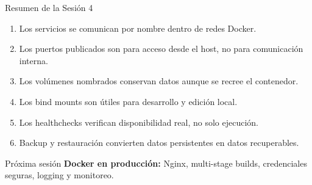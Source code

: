 \documentclass[aspectratio=169]{beamer}
\begin{document}
\begin{frame}{Resumen de la Sesión 4}
  \footnotesize
  \begin{enumerate}
    \item Los servicios se comunican por nombre dentro de redes Docker.
    \item Los puertos publicados son para acceso desde el host, no para comunicación interna.
    \item Los volúmenes nombrados conservan datos aunque se recree el contenedor.
    \item Los bind mounts son útiles para desarrollo y edición local.
    \item Los healthchecks verifican disponibilidad real, no solo ejecución.
    \item Backup y restauración convierten datos persistentes en datos recuperables.
  \end{enumerate}
  \vspace{0.08cm}
  \begin{alertblock}{Próxima sesión}
    \textbf{Docker en producción:} Nginx, multi-stage builds, credenciales seguras, logging y monitoreo.
  \end{alertblock}
\end{frame}

\end{document}
